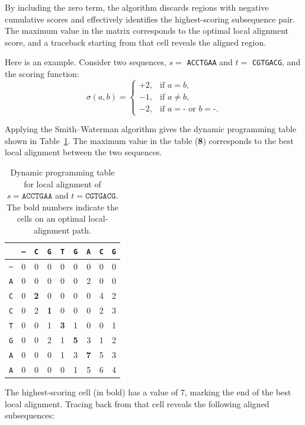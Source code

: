 By including the zero term, the algorithm discards regions with negative cumulative scores
and effectively identifies the highest-scoring subsequence pair. The maximum value in the
matrix corresponds to the optimal local alignment score, and a traceback starting from that
cell reveals the aligned region.



Here is an example. Consider two sequences, $s =$ \texttt{ACCTGAA} and $t =$ \texttt{CGTGACG}, and the scoring function:
\[
\sigma(a,b) =
\begin{cases}
+2, & \text{if } a = b,\\[4pt]
-1, & \text{if } a \neq b,\\[4pt]
-2, & \text{if } a = \texttt{-} \text{ or } b = \texttt{-}.
\end{cases}
\]

Applying the Smith--Waterman algorithm gives the dynamic programming table shown in Table~\ref{t:smith-waterman}. 
The maximum value in the table (\textbf{8}) corresponds to the best local alignment between the two sequences.

\begin{table}[h!]
\centering
\caption{Dynamic programming table for local alignment of $s=\texttt{ACCTGAA}$ and $t=\texttt{CGTGACG}$. 
The bold numbers indicate the cells on an optimal local-alignment path.}
\label{t:smith-waterman}
\begin{tabular}{c|cccccccc}
\hline
 & \texttt{–} & \texttt{C} & \texttt{G} & \texttt{T} & \texttt{G} & \texttt{A} & \texttt{C} & \texttt{G} \\
\hline
\texttt{–} & 0 & 0 & 0 & 0 & 0 & 0 & 0 & 0 \\
\texttt{A} & 0 & 0 & 0 & 0 & 0 & 2 & 0 & 0 \\
\texttt{C} & 0 & \textbf{2} & 0 & 0 & 0 & 0 & 4 & 2 \\
\texttt{C} & 0 & 2 & \textbf{1} & 0 & 0 & 0 & 2 & 3 \\
\texttt{T} & 0 & 0 & 1 & \textbf{3} & 1 & 0 & 0 & 1 \\
\texttt{G} & 0 & 0 & 2 & 1 & \textbf{5} & 3 & 1 & 2 \\
\texttt{A} & 0 & 0 & 0 & 1 & 3 & \textbf{7} & 5 & 3 \\
\texttt{A} & 0 & 0 & 0 & 0 & 1 & 5 & 6 & 4 \\
\hline
\end{tabular}
\end{table}

The highest-scoring cell (in bold) has a value of $7$, marking the end of the best local alignment. 
Tracing back from that cell reveals the following aligned subsequences:

